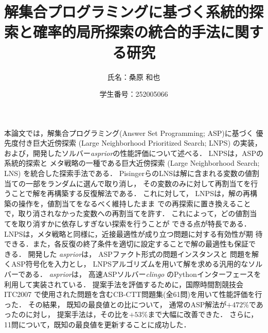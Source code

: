 \documentclass[dvipdfmx,a4paper]{jsarticle}
\title{\vspace{-3cm}解集合プログラミングに基づく系統的探索と確率的局所探索の統合的手法に関する研究}
\author{氏名：桑原 和也}
\date{学生番号：252005066}
\begin{document}
\maketitle

本論文では，解集合プログラミング(Answer Set Programming; ASP)に基づく
優先度付き巨大近傍探索 (Large Neighborhood Prioritized Search; LNPS)
の実装，および，開発したソルバー\textit{asprior}の性能評価について述べる．
%
LNPSは，ASPの系統的探索と
メタ戦略の一種である巨大近傍探索
(Large Neighborhood Search; LNS)
を統合した探索手法である．
%
PisingerらのLNSは解に含まれる変数の値割当ての一部をランダムに選んで取り消し，
その変数のみに対して再割当てを行うことで解を再構築する反復解法である．
これに対して，
LNPSは，解の再構築の操作を，値割当てをなるべく維持したまま
での再探索に置き換えることで，取り消されなかった変数への再割当てを許す．
これによって，どの値割当てを取り消すかに依存しすぎない探索を行うことが
できる点が特長である．
LNPSは，メタ戦略と同様に，近接最適性が成り立つ問題に対する有効性が期
待できる．また，各反復の終了条件を適切に設定することで解の最適性も保証で
きる．
開発した \textit{asprior}は，
ASPファクト形式の問題インスタンスと
問題を解くASP符号化を入力とし，
LNPSアルゴリズムを用いて解を求める汎用的なソルバーである．
\textit{asprior}は，
高速ASPソルバー\textit{clingo}
のPythonインターフェースを利用して実装されている．
%
提案手法を評価するために，国際時間割競技会ITC2007
で使用された問題を含むCB-CTT問題集(全61問)を用いて性能評価を行った．
その結果，
既知の最良値との比について，
通常のASP解法が$+472\%$であったのに対し，
提案手法は，その比を$+53\%$まで大幅に改善できた．
さらに，11問について，既知の最良値を更新することに成功した．
\end{document}
